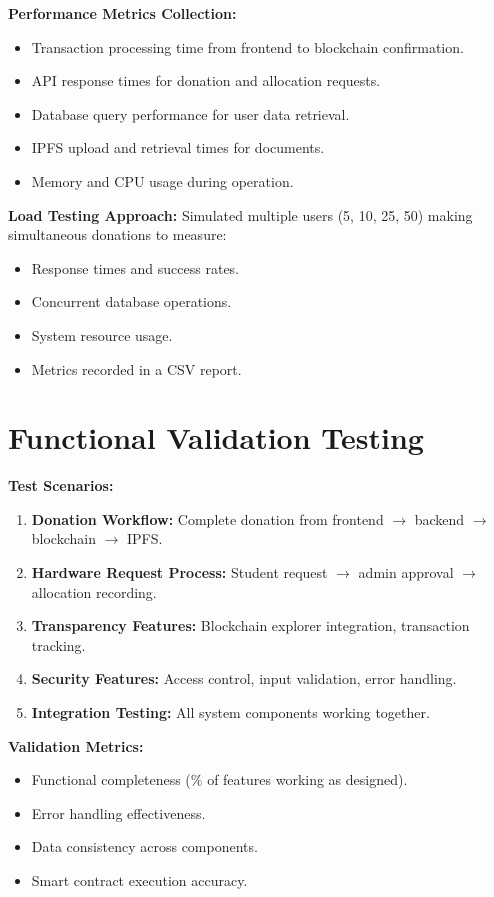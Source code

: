 \documentclass[a4paper,12pt]{report}
\begin{document}
\textbf{Performance Metrics Collection:}
\begin{itemize}
    \item Transaction processing time from frontend to blockchain confirmation.
    \item API response times for donation and allocation requests.
    \item Database query performance for user data retrieval.
    \item IPFS upload and retrieval times for documents.
    \item Memory and CPU usage during operation.
\end{itemize}

\textbf{Load Testing Approach:}
Simulated multiple users (5, 10, 25, 50) making simultaneous donations to measure:
\begin{itemize}
    \item Response times and success rates.
    \item Concurrent database operations.
    \item System resource usage.
    \item Metrics recorded in a CSV report.
\end{itemize}

\section{Functional Validation Testing}
\textbf{Test Scenarios:}
\begin{enumerate}
    \item \textbf{Donation Workflow:} Complete donation from frontend \(\rightarrow\) backend \(\rightarrow\) blockchain \(\rightarrow\) IPFS.
    \item \textbf{Hardware Request Process:} Student request \(\rightarrow\) admin approval \(\rightarrow\) allocation recording.
    \item \textbf{Transparency Features:} Blockchain explorer integration, transaction tracking.
    \item \textbf{Security Features:} Access control, input validation, error handling.
    \item \textbf{Integration Testing:} All system components working together.
\end{enumerate}

\textbf{Validation Metrics:}
\begin{itemize}
    \item Functional completeness (\% of features working as designed).
    \item Error handling effectiveness.
    \item Data consistency across components.
    \item Smart contract execution accuracy.
\end{itemize}
\end{document}

